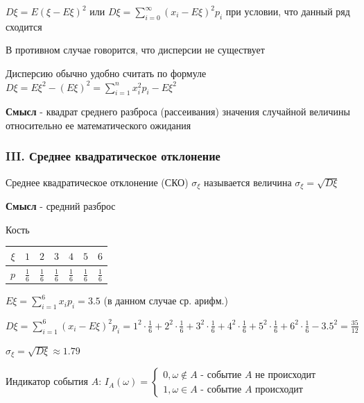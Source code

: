 \documentclass[12pt]{article}
\begin{document}
    $D\xi = E (\xi - E\xi)^2$ или $D\xi = \sum_{i = 0}^\infty (x_i - E\xi)^2 p_i$ при условии, что данный ряд сходится

    В противном случае говорится, что дисперсии не существует

    \Nota Дисперсию обычно удобно считать по формуле $D\xi = E\xi^2 - (E\xi)^2 = \sum_{i = 1}^n x^2_i p_i - E\xi^2$

    \textbf{Смысл} - квадрат среднего разброса (рассеивания) значения случайной величины относительно ее математического
    ожидания

    \subsubsection{III. Среднее квадратическое отклонение}

    \Defs Среднее квадратическое отклонение (СКО) $\sigma_\xi$ называется величина $\sigma_\xi = \sqrt{D\xi}$

    \textbf{Смысл} - средний разброс

     Кость

    \smallvspace


    \begin{tabular}{c|c|c|c|c|c|c}
        $\xi$ & $1$           & $2$           & $3$           & $4$           & $5$           & $6$           \\
        \hline
        $p$   & $\frac{1}{6}$ & $\frac{1}{6}$ & $\frac{1}{6}$ & $\frac{1}{6}$ & $\frac{1}{6}$ & $\frac{1}{6}$
    \end{tabular}


    $E\xi = \sum_{i = 1}^6 x_i p_i = 3.5$ (в данном случае ср. арифм.)

    $D\xi = \sum_{i = 1}^6 (x_i - E\xi)^2 p_i = 1^2 \cdot \frac{1}{6} + 2^2 \cdot \frac{1}{6} + 3^2 \cdot \frac{1}{6} + 4^2 \cdot \frac{1}{6} + 5^2 \cdot \frac{1}{6} + 6^2 \cdot \frac{1}{6} - 3.5^2 = \frac{35}{12} $

    $\sigma_\xi = \sqrt{D\xi} \approx 1.79$

     Индикатор события $A$: $I_A (\omega) = \begin{cases}
                                                       0, \omega \notin A \text{ - событие } A \text{ не происходит} \\ 1, \omega \in A \text{ - событие } A \text{ происходит}
    \end{cases}$
\end{document}

